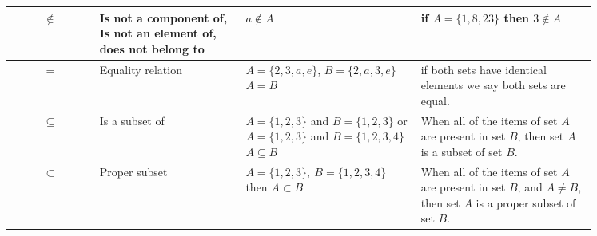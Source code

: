 \documentclass[./main.tex]{subfiles}
\begin{document}
\begin{center}
\begin{longtable}[h]{|c|p{0.25\linewidth}|p{0.3\linewidth}|p{0.3\linewidth}|}
            $\notin$		& Is not a component of,
                                Is not an element of,
                                does not belong to 		& $a \notin A$									& if $A = \{1,8,23 \} $ then $3 \notin A$\\ \hline

            $=$				& Equality relation			& $A = \{ 2,3,a,e \}$,
                                                          $B = \{ 2,a,3,e \}$
                                                          $A = B$										& if both sets have identical elements we say both
                                                                                                            sets are equal. \\ \hline

           $\subseteq$		& Is a subset of			& $A= \{1,2,3\}$ and $B=\{1,2,3\}$ or
                                                          $A= \{1,2,3\}$ and $B=\{1,2,3,4\}$
                                                          $A \subseteq B$                               & When all of the items of set $A$
                                                                                                             are present in set $B$,
                                                                                                             then set $A$ is a subset of set $B$. \\ \hline

          $\subset$			& Proper subset				& $A= \{1,2,3\},\ B=\{1,2,3,4 \}$ then
                                                          $A \subset B$									& When all of the items of set $A$ are present in set $B$,
                                                                                                          and $A \neq B$,
                                                                                                          then set $A$ is a proper subset of set $B$. \\ \hline


        \end{longtable}
    \end{center}
\end{document}
